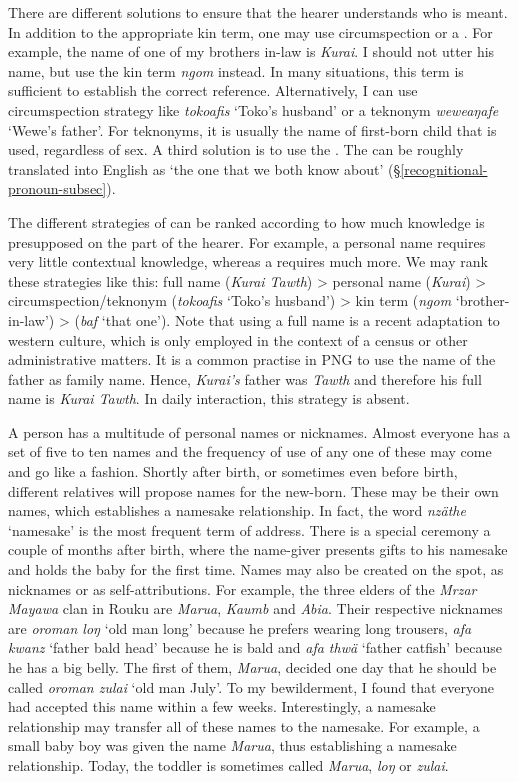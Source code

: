 There are different solutions to ensure that the hearer understands who is meant. In addition to the appropriate kin term, one may use circumspection or a  . For example, the name of one of my brothers in-law is \emph{Kurai}. I should not utter his name, but use the kin term \emph{ngom} instead. In many situations, this term is sufficient to establish the correct reference. Alternatively, I can use circumspection strategy like \emph{tokoafis} `Toko's husband' or a teknonym \emph{weweaŋafe} `Wewe's father'. For teknonyms, it is usually the name of first-born child that is used, regardless of sex. A third solution is to use the  . The   can be roughly translated into English as `the one that we both know about' (\S\ref{recognitional-pronoun-subsec}).

The different strategies of  can be ranked according to how much knowledge is presupposed on the part of the hearer. For example, a personal name requires very little contextual knowledge, whereas a   requires much more. We may rank these strategies like this: full name (\emph{Kurai Tawth}) > personal name (\emph{Kurai}) > circumspection/teknonym (\emph{tokoafis} `Toko's husband') > kin term (\emph{ngom} `brother-in-law') >  (\emph{baf} `that one'). Note that using a full name is a recent adaptation to western culture, which is only employed in the context of a census or other administrative matters. It is a common practise in PNG to use the name of the father as family name. Hence, \emph{Kurai's} father was \emph{Tawth} and therefore his full name is \emph{Kurai Tawth}. In daily interaction, this strategy is absent.

A person has a multitude of personal names or nicknames. Almost everyone has a set of five to ten names and the frequency of use of any one of these may come and go like a fashion. Shortly after birth, or sometimes even before birth, different relatives will propose names for the new-born. These may be their own names, which establishes a namesake relationship. In fact, the word \emph{nzäthe} `namesake' is the most frequent term of address. There is a special ceremony a couple of months after birth, where the name-giver presents gifts to his namesake and holds the baby for the first time. Names may also be created on the spot, as nicknames or as self-attributions. For example, the three elders of the \emph{Mrzar Mayawa} clan in Rouku are \emph{Marua}, \emph{Kaumb} and \emph{Abia}. Their respective nicknames are \emph{oroman loŋ} `old man long' because he prefers wearing long trousers, \emph{afa kwanz} `father bald head' because he is bald and \emph{afa thwä} `father catfish' because he has a big belly. The first of them, \emph{Marua}, decided one day that he should be called \emph{oroman zulai} `old man July'. To my bewilderment, I found that everyone had accepted this name within a few weeks. Interestingly, a namesake relationship may transfer all of these names to the namesake. For example, a small baby boy was given the name \emph{Marua}, thus establishing a namesake relationship. Today, the toddler is sometimes called \emph{Marua}, \emph{loŋ} or \emph{zulai}.

